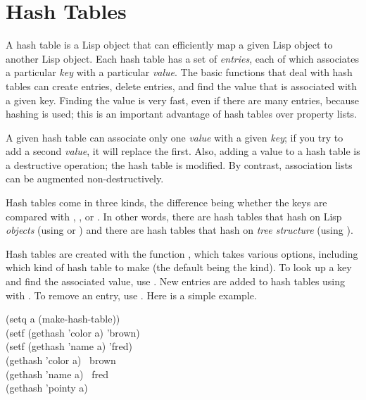 
\clearpage\def\pagestatus{FINAL PROOF}

\ifx \rulang\Undef

\chapter{Hash Tables}
\label{HASH}

A hash table is a Lisp object that can efficiently map a given
Lisp object to another Lisp object.
Each hash table has a set of \emph{entries}, each of which associates a
particular \emph{key} with a particular \emph{value}.  The basic functions
that deal with hash tables can create entries, delete entries, and find
the value that is associated with a given key.  Finding the value is
very fast, even if there are many entries, because hashing is used; this
is an important advantage of hash tables over property lists.

A given hash table can associate only one \emph{value} with a given
\emph{key}; if you try to add a second \emph{value}, it will replace the
first.  Also, adding a value to a hash table is a destructive operation;
the hash table is modified.  By contrast, association lists can be
augmented non-destructively.

Hash tables come in three kinds, the difference being whether the keys
are compared with , , or .  In other words, there
are hash tables that hash on Lisp \emph{objects} (using  or )
and there are hash tables that hash on \emph{tree structure}
(using ).

Hash tables are created with the function
, which takes various options, including
which kind of hash table to make (the default being the  kind).
To look up a key and find
the associated value, use .
New entries are added
to hash tables using  with .
To remove an entry, use .  Here is a simple example.
\begin{lisp}
(setq a (make-hash-table)) \\
(setf (gethash 'color a) 'brown) \\
(setf (gethash 'name a) 'fred) \\
(gethash 'color a) \EV\ brown \\
(gethash 'name a) \EV\ fred \\
(gethash 'pointy a) \EV\ {\false}
\end{lisp}


